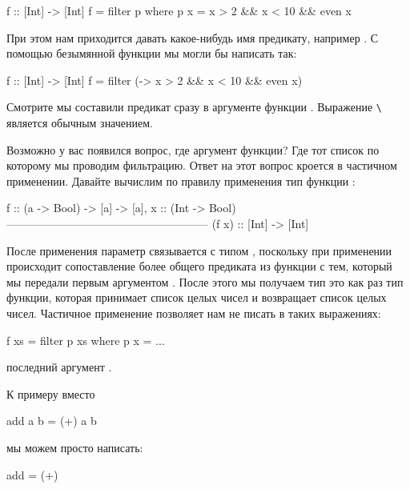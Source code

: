 \begin{code}
f :: [Int] -> [Int]
f = filter p
    where p x = x > 2 && x < 10 && even x
\end{code}

При этом нам приходится давать какое-нибудь имя предикату, например
. С помощью безымянной функции мы могли бы написать так:


\begin{code}
f :: [Int] -> [Int]
f = filter (\x -> x > 2 && x < 10 && even x)
\end{code}

Смотрите мы составили предикат сразу в аргументе функции .
Выражение \In{(}\verb!\! является
обычным значением.

Возможно у вас появился вопрос, где аргумент функции? Где тот список по
которому мы проводим фильтрацию. Ответ на этот вопрос кроется в
частичном применении. Давайте вычислим по правилу применения тип функции
:


\begin{code}
    f :: (a -> Bool) -> [a] -> [a],    x :: (Int -> Bool)
    ------------------------------------------------------
                (f x) :: [Int] -> [Int]
\end{code}

После применения параметр  связывается с типом , поскольку
при применении происходит сопоставление более общего предиката
 из функции  с тем, который мы передали первым
аргументом . После этого мы получаем тип
 это как раз тип функции, которая принимает
список целых чисел и возвращает список целых чисел. Частичное применение
позволяет нам не писать в таких выражениях:


\begin{code}
f xs = filter p xs
    where p x = ...
\end{code}

\noindent 

последний аргумент .

К примеру вместо


\begin{code}
add a b = (+) a b
\end{code}

\noindent 

мы можем просто написать:


\begin{code}
add = (+)
\end{code}


